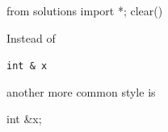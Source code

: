 \begin{python0}
from solutions import *; clear()
\end{python0}

Instead of

\texttt{int \& x}

another more common style is

int \&x;


